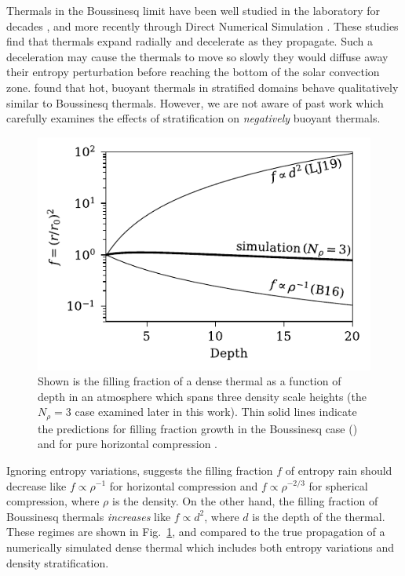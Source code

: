 Thermals in the Boussinesq limit have been well studied in the laboratory for decades \cite[see e.g.][]{morton&all1956, scorer1957}, and more recently through Direct Numerical Simulation \cite[DNS,][]{lecoanet&jeevanjee2018}. 
These studies find that thermals expand radially and decelerate as they propagate.
Such a deceleration may cause the thermals to move so slowly they would diffuse away their entropy perturbation before reaching the bottom of the solar convection zone.
\cite{brandenburg&hazlehurst2001} found that hot, buoyant thermals in stratified domains behave qualitatively similar to Boussinesq thermals.
However, we are not aware of past work which carefully examines the effects of stratification on \emph{negatively} buoyant thermals.


\begin{figure}[p!]
    \includegraphics[width=\columnwidth]{./figs/overview_fig.pdf}
    \caption[Filling factor evolution of entropy raindrops according to limiting theories and simulations.]
	{
	Shown is the filling fraction of a dense thermal as a function of depth in an atmosphere which spans three density scale heights (the $N_\rho = 3$ case examined later in this work). 
	Thin solid lines indicate the predictions for filling fraction growth in the Boussinesq case (\LJ) and for pure horizontal compression \cite[B16,][]{brandenburg2016}.
    \label{fig:overview} }
\end{figure}

Ignoring entropy variations, \cite{brandenburg2016} suggests the filling fraction $f$ of entropy rain should decrease like $f \propto \rho^{-1}$ for horizontal compression and $f \propto \rho^{-2/3}$ for spherical compression, where $\rho$ is the density.
On the other hand, the filling fraction of Boussinesq thermals \emph{increases} like $f \propto d^2$, where $d$ is the depth of the thermal.
These regimes are shown in Fig.~\ref{fig:overview}, and compared to the true propagation of a numerically simulated dense thermal which includes both entropy variations and density stratification.

